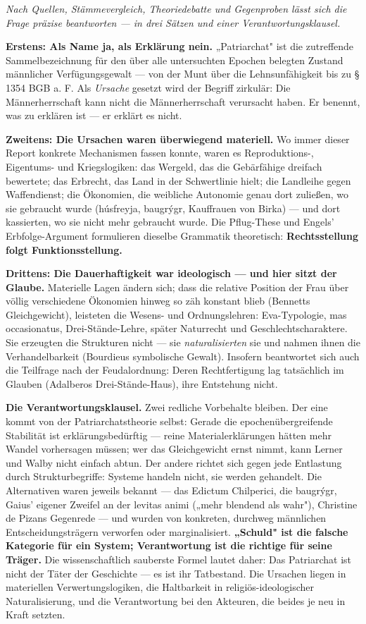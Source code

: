 \documentclass[11pt,a4paper,ngerman]{scrartcl}
\begin{document}
\noindent\textit{Nach Quellen, Stämmevergleich, Theoriedebatte und Gegenproben lässt sich die Frage präzise beantworten — in drei Sätzen und einer Verantwortungsklausel.}
\medskip

\textbf{Erstens: Als Name ja, als Erklärung nein.} „Patriarchat" ist die zutreffende Sammelbezeichnung für den über alle untersuchten Epochen belegten Zustand männlicher Verfügungsgewalt — von der Munt über die Lehnsunfähigkeit bis zu § 1354 BGB a. F. Als \emph{Ursache} gesetzt wird der Begriff zirkulär: Die Männerherrschaft kann nicht die Männerherrschaft verursacht haben. Er benennt, was zu erklären ist — er erklärt es nicht.

\textbf{Zweitens: Die Ursachen waren überwiegend materiell.} Wo immer dieser Report konkrete Mechanismen fassen konnte, waren es Reproduktions-, Eigentums- und Kriegslogiken: das Wergeld, das die Gebärfähige dreifach bewertete; das Erbrecht, das Land in der Schwertlinie hielt; die Landleihe gegen Waffendienst; die Ökonomien, die weibliche Autonomie genau dort zuließen, wo sie gebraucht wurde (húsfreyja, baugrýgr, Kauffrauen von Birka) — und dort kassierten, wo sie nicht mehr gebraucht wurde. Die Pflug-These und Engels' Erbfolge-Argument formulieren dieselbe Grammatik theoretisch: \textbf{Rechtsstellung folgt Funktionsstellung.}

\textbf{Drittens: Die Dauerhaftigkeit war ideologisch — und hier sitzt der Glaube.} Materielle Lagen ändern sich; dass die relative Position der Frau über völlig verschiedene Ökonomien hinweg so zäh konstant blieb (Bennetts Gleichgewicht), leisteten die Wesens- und Ordnungslehren: Eva-Typologie, mas occasionatus, Drei-Stände-Lehre, später Naturrecht und Geschlechtscharaktere. Sie erzeugten die Strukturen nicht — sie \emph{naturalisierten} sie und nahmen ihnen die Verhandelbarkeit (Bourdieus symbolische Gewalt). Insofern beantwortet sich auch die Teilfrage nach der Feudalordnung: Deren Rechtfertigung lag tatsächlich im Glauben (Adalberos Drei-Stände-Haus), ihre Entstehung nicht.

\textbf{Die Verantwortungsklausel.} Zwei redliche Vorbehalte bleiben. Der eine kommt von der Patriarchatstheorie selbst: Gerade die epochenübergreifende Stabilität ist erklärungsbedürftig — reine Materialerklärungen hätten mehr Wandel vorhersagen müssen; wer das Gleichgewicht ernst nimmt, kann Lerner und Walby nicht einfach abtun. Der andere richtet sich gegen jede Entlastung durch Strukturbegriffe: Systeme handeln nicht, sie werden gehandelt. Die Alternativen waren jeweils bekannt — das Edictum Chilperici, die baugrýgr, Gaius' eigener Zweifel an der levitas animi („mehr blendend als wahr"), Christine de Pizans Gegenrede — und wurden von konkreten, durchweg männlichen Entscheidungsträgern verworfen oder marginalisiert. \textbf{„Schuld" ist die falsche Kategorie für ein System; Verantwortung ist die richtige für seine Träger.} Die wissenschaftlich sauberste Formel lautet daher: Das Patriarchat ist nicht der Täter der Geschichte — es ist ihr Tatbestand. Die Ursachen liegen in materiellen Verwertungslogiken, die Haltbarkeit in religiös-ideologischer Naturalisierung, und die Verantwortung bei den Akteuren, die beides je neu in Kraft setzten.
\end{document}
